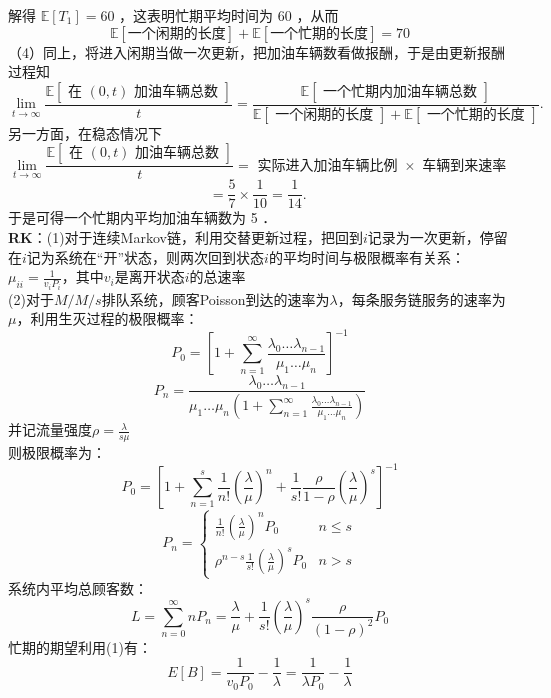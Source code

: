 \documentclass[UTF8,openany]{book}
\begin{document}
解得 $\mathbb{E} [T_1]=60$ ，这表明忙期平均时间为 60 ，从而
$$\mathbb{E}[ \text{一个闲期的长度} ]+\mathbb{E}[ \text{一个忙期的长度} ]=70$$
（4）同上，将进入闲期当做一次更新，把加油车辆数看做报酬，于是由更新报酬过程知\\
$$
\lim _{t \rightarrow \infty} \frac{\mathbb{E}[\text { 在 }(0, t) \text { 加油车辆总数 }]}{t}=\frac{\mathbb{E}[\text { 一个忙期内加油车辆总数 }]}{\mathbb{E}[\text { 一个闲期的长度 }]+\mathbb{E}[\text { 一个忙期的长度 }]} .
$$
另一方面，在稳态情况下\\
\[
\lim _{t \rightarrow \infty} \frac{\mathbb{E}[\text { 在 }(0, t) \text { 加油车辆总数 }]}{t}=\text { 实际进入加油车辆比例 } \times \text { 车辆到来速率 }
\]
\[
=\frac{5}{7} \times \frac{1}{10}=\frac{1}{14} \text {. }
\]
于是可得一个忙期内平均加油车辆数为 5 ．\\
\textbf{RK}：(1)对于连续Markov链，利用交替更新过程，把回到$i$记录为一次更新，停留在$i$记为系统在“开”状态，则两次回到状态$i$的平均时间与极限概率有关系：$\mu_{ii}=\frac{1}{v_i P_i}$，其中$v_i$是离开状态$i$的总速率\\
(2)对于$M/ M/ s$排队系统，顾客Poisson到达的速率为$\lambda$，每条服务链服务的速率为$\mu$，利用生灭过程的极限概率：\\
\[
P_0=\left[1+\sum\limits_{n=1}^{\infty} \frac{\lambda_0 \dots \lambda_{n-1}}{\mu_1 \dots \mu_n} \right] ^{-1}
\]
\[
P_n=\frac{\lambda_0 \dots \lambda_{n-1}}{\mu_1 \dots \mu_n\left(1+\sum\limits_{n=1}^{\infty} \frac{\lambda_0 \dots \lambda_{n-1}}{\mu_1 \dots \mu_n} \right) }
\]
并记流量强度$\rho=\frac{\lambda}{s\mu}$\\
则极限概率为：
\[
P_0=\left[1+\sum\limits_{n=1}^{s} \frac{1}{n!} \left( \frac{\lambda}{\mu}\right) ^n+\frac{1}{s!} \frac{\rho}{1-\rho} \left(\frac{\lambda}{\mu} \right) ^s \right] ^{-1}
\]
\[
P_n=
\begin{cases}
	\frac{1}{n!} \left(\frac{\lambda}{\mu} \right)^n P_0  &  n \le s \\
	\rho^{n-s} \frac{1}{s!} \left(\frac{\lambda}{\mu} \right)^s P_0  &  n>s
\end{cases}
\]
系统内平均总顾客数：
\[
L=\sum\limits_{n=0}^{\infty} nP_n=\frac{\lambda}{\mu}+\frac{1}{s!} \left(\frac{\lambda}{\mu} \right)^s \frac{\rho}{\left(1-\rho \right)^2 } P_0
\]
忙期的期望利用(1)有：
\[
E[B]=\frac{1}{v_0P_0}-\frac{1}{\lambda}=\frac{1}{\lambda P_0}-\frac{1}{\lambda}
\]\\
\end{document}
